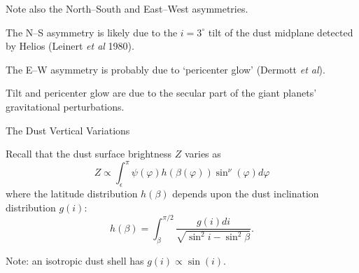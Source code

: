 \documentclass[20pt,35mmSlide,landscape]{foils}
\begin{document}
\parbox{10in}{Note also the North--South and East--West asymmetries.}

\newpage
\pagecolor{light-yellow}
\small

\vspace*{-1.5in}\parbox{10in}{
\parbox[c]{4.75in}{
\vspace*{-0.7in}\begin{figure}[t]
\end{figure}
\vspace*{-3ex}\parbox{4.5in}{The N--S asymmetry is likely due to the
$i=3^\circ$ tilt of the dust midplane detected by Helios
(Leinert {\it et al} 1980).}
}
\hfil\parbox{4.75in}{
\vspace*{-0.4in}\begin{figure}[t]
\vspace*{0.2in}
\end{figure}
\parbox{4in}{The E--W asymmetry is probably due to `pericenter glow'
(Dermott {\it et al}).\vspace*{2.5ex}}
}
}
\parbox{10in}{Tilt and pericenter glow are due to the secular part
of the giant planets' gravitational perturbations.}

\newpage
\pagecolor{light-yellow}
\normalsize

\vspace*{-1in}\begin{center}
{\large The Dust Vertical Variations}
\end{center}
\noindent Recall that the dust surface brightness $Z$ varies as
\begin{displaymath}
Z\propto\int_\epsilon^\pi\psi(\varphi)h(\beta(\varphi))
\sin^\nu(\varphi)d\varphi
\end{displaymath}
where the latitude distribution $h(\beta)$ depends upon
the dust inclination distribution $g(i)$:
\begin{displaymath}
h(\beta)=\int^{\pi/2}_\beta
\frac{g(i)di}{\sqrt{\sin^2i-\sin^2\beta}}.
\end{displaymath}

\noindent Note: an isotropic dust shell has $g(i)\propto\sin(i)$.
\end{document}

